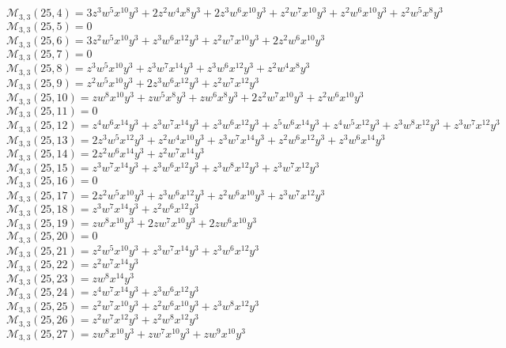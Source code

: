 \documentclass[12pt]{memoireuqam1.3}
\begin{document}
$\mathcal{M}_{3,3}(25,4)=3z^3w^5x^{10}y^3+2z^2w^4x^8y^3+2z^3w^6x^{10}y^3+z^2w^7x^{10}y^3+z^2w^6x^{10}y^3+z^2w^5x^8y^3$\\
$\mathcal{M}_{3,3}(25,5)=0$\\
$\mathcal{M}_{3,3}(25,6)=3z^2w^5x^{10}y^3+z^3w^6x^{12}y^3+z^2w^7x^{10}y^3+2z^2w^6x^{10}y^3$\\
$\mathcal{M}_{3,3}(25,7)=0$\\
$\mathcal{M}_{3,3}(25,8)=z^3w^5x^{10}y^3+z^3w^7x^{14}y^3+z^3w^6x^{12}y^3+z^2w^4x^8y^3$\\
$\mathcal{M}_{3,3}(25,9)=z^2w^5x^{10}y^3+2z^3w^6x^{12}y^3+z^2w^7x^{12}y^3$\\
$\mathcal{M}_{3,3}(25,10)=zw^8x^{10}y^3+zw^5x^8y^3+zw^6x^8y^3+2z^2w^7x^{10}y^3+z^2w^6x^{10}y^3$\\
$\mathcal{M}_{3,3}(25,11)=0$\\
$\mathcal{M}_{3,3}(25,12)=z^4w^6x^{14}y^3+z^3w^7x^{14}y^3+z^3w^6x^{12}y^3+z^5w^6x^{14}y^3+z^4w^5x^{12}y^3+z^3w^8x^{12}y^3+z^3w^7x^{12}y^3$\\
$\mathcal{M}_{3,3}(25,13)=2z^3w^5x^{12}y^3+z^2w^4x^{10}y^3+z^3w^7x^{14}y^3+z^2w^6x^{12}y^3+z^3w^6x^{14}y^3$\\
$\mathcal{M}_{3,3}(25,14)=2z^2w^6x^{14}y^3+z^2w^7x^{14}y^3$\\
$\mathcal{M}_{3,3}(25,15)=z^3w^7x^{14}y^3+z^3w^6x^{12}y^3+z^3w^8x^{12}y^3+z^3w^7x^{12}y^3$\\
$\mathcal{M}_{3,3}(25,16)=0$\\
$\mathcal{M}_{3,3}(25,17)=2z^2w^5x^{10}y^3+z^3w^6x^{12}y^3+z^2w^6x^{10}y^3+z^3w^7x^{12}y^3$\\
$\mathcal{M}_{3,3}(25,18)=z^3w^7x^{14}y^3+z^2w^6x^{12}y^3$\\
$\mathcal{M}_{3,3}(25,19)=zw^8x^{10}y^3+2zw^7x^{10}y^3+2zw^6x^{10}y^3$\\
$\mathcal{M}_{3,3}(25,20)=0$\\
$\mathcal{M}_{3,3}(25,21)=z^2w^5x^{10}y^3+z^3w^7x^{14}y^3+z^3w^6x^{12}y^3$\\
$\mathcal{M}_{3,3}(25,22)=z^2w^7x^{14}y^3$\\
$\mathcal{M}_{3,3}(25,23)=zw^8x^{14}y^3$\\
$\mathcal{M}_{3,3}(25,24)=z^4w^7x^{14}y^3+z^3w^6x^{12}y^3$\\
$\mathcal{M}_{3,3}(25,25)=z^2w^7x^{10}y^3+z^2w^6x^{10}y^3+z^3w^8x^{12}y^3$\\
$\mathcal{M}_{3,3}(25,26)=z^2w^7x^{12}y^3+z^2w^8x^{12}y^3$\\
$\mathcal{M}_{3,3}(25,27)=zw^8x^{10}y^3+zw^7x^{10}y^3+zw^9x^{10}y^3$\\
\end{document}
